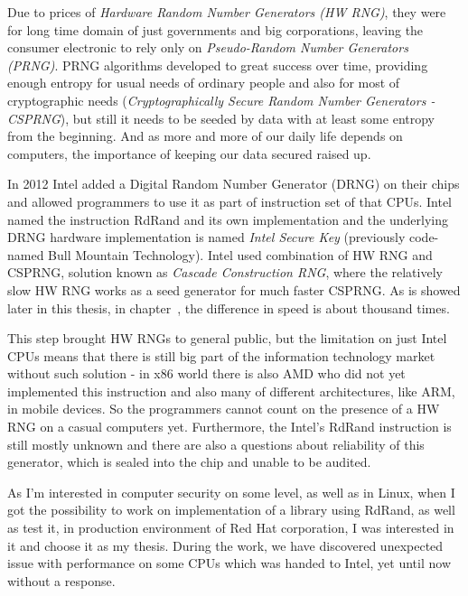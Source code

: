 Due to prices of {\em Hardware Random Number Generators (HW RNG)}, they were for long time domain of just governments and big corporations,%
leaving the consumer electronic to rely only on {\em Pseudo-Random Number Generators (PRNG)}. PRNG algorithms developed to great success over time, providing enough entropy for usual needs of ordinary people and also for most of cryptographic needs ({\em Cryptographically Secure Random Number Generators - CSPRNG}), but still it needs to be seeded by data with at least some entropy from the beginning. And as more and more of our daily life depends on computers, the importance of keeping our data secured raised up. 

In 2012\cite{IntelRdRandFindAbout} Intel added a Digital Random Number Generator (DRNG) on their chips and allowed programmers to use it as part of instruction set of that CPUs. Intel named the instruction RdRand and its own implementation and the underlying DRNG hardware implementation is named {\em Intel Secure Key} (previously code-named Bull Mountain Technology)\cite{IntelDRNGAnalysis}. Intel used combination of HW RNG and CSPRNG, solution known as {\em Cascade Construction RNG}, where the relatively slow HW RNG works as a seed generator for much faster CSPRNG. As is showed later in this thesis, in chapter~, the difference in speed is about thousand times.

This step brought HW RNGs to general public, but the limitation on just Intel CPUs means that there is still big part of the information technology market without such solution - in x86 world there is also AMD who did not yet implemented this instruction and also many of different architectures, like ARM, in mobile devices. So the programmers cannot count on the presence of a HW RNG on a casual computers yet. Furthermore, the Intel's RdRand instruction is still mostly unknown and there are also a questions about reliability of this generator, which is sealed into the chip and unable to be audited.\cite{TheodoreTsoNSA}

As I'm interested in computer security on some level, as well as in Linux, when I got the possibility to work on implementation of a library using RdRand, as well as test it, in production environment of Red Hat corporation, I was interested in it and choose it as my thesis. During the work, we have discovered unexpected issue with performance on some CPUs which was handed to Intel, yet until now without a response.

